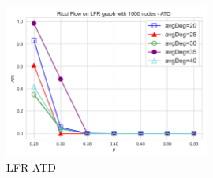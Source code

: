 \begin{figure}
    \centering
    \includegraphics[width=0.6\textwidth]{../tests/LFRResults/LFR_ATD.png}
    \caption{LFR ATD}
\end{figure}
\label{fig:LFR_ATD}